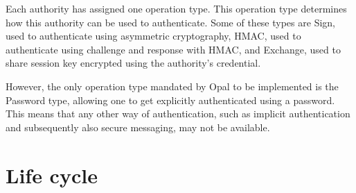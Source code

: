 
Each authority has assigned one operation type. This operation type determines how this authority can be used to authenticate.
Some of these types are Sign, used to authenticate using asymmetric cryptography, HMAC, used to authenticate using challenge and response with HMAC, and Exchange, used to share session key encrypted using the authority's credential.

However, the only operation type mandated by Opal to be implemented is the Password type, allowing one to get explicitly authenticated using a password. This means that any other way of authentication, such as implicit authentication and subsequently also secure messaging, may not be available.


\section{Life cycle}

